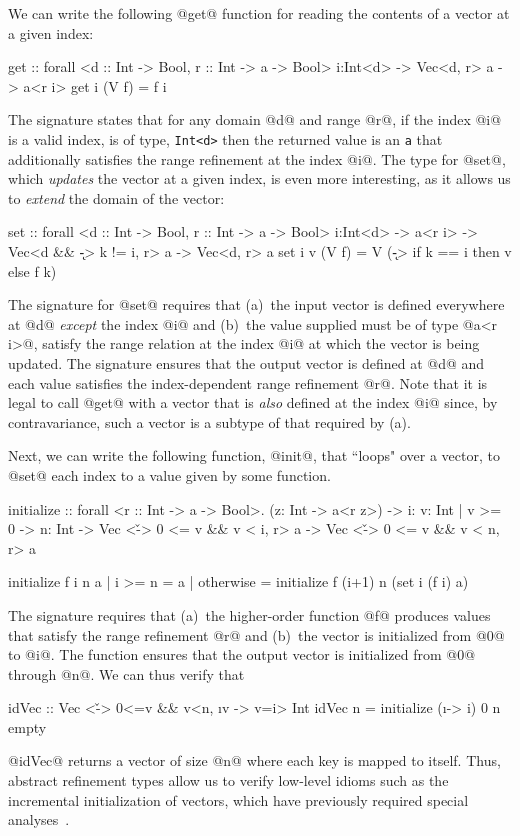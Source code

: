 {{{{
We can write the following @get@ function for reading the contents
of a vector at a given index:
%
\begin{code}
  get :: forall <d :: Int -> Bool, r :: Int -> a -> Bool>
         i:Int<d> -> Vec<d, r> a -> a<r i>
  get i (V f) = f i
\end{code}
%
The signature states that for any domain @d@ and range @r@,
if the index @i@ is a valid index, \ie is of type, \verb+Int<d>+ 
then the returned value is an \verb+a+ that additionally satisfies the
range refinement at the index @i@.
%
The type for @set@, which \emph{updates} the vector at
a given index, is even more interesting, as it allows us to 
\emph{extend} the domain of the vector:
%
\begin{code}
  set :: forall <d :: Int -> Bool, r :: Int -> a -> Bool>
         i:Int<d>
      -> a<r i>
      -> Vec<d && {\k -> k != i}, r> a
      -> Vec<d, r> a
  set i v (V f) = V (\k -> if k == i then v else f k)
\end{code}
%
The signature for @set@ requires that 
(a)~the input vector is defined everywhere at @d@ \emph{except}
the index @i@ and 
(b)~the value supplied must be of type @a<r i>@, \ie satisfy the range 
relation at the index @i@ at which the vector is being updated.
The signature ensures that the output vector is defined at
@d@ and each value satisfies the index-dependent range refinement @r@.
%
Note that it is legal to call @get@ with a vector that is \emph{also} 
defined at the index @i@ since, by contravariance, such a vector is a
subtype of that required by (a).


 Next, we can write the following function,
@init@, that ``loops" over a vector, to @set@ each index to 
a value given by some function.
%
\begin{code}
  initialize :: forall <r :: Int -> a -> Bool>.
                (z: Int -> a<r z>) 
             -> i: {v: Int | v >= 0} 
             -> n: Int 
             -> Vec <{\v -> 0 <= v && v < i}, r> a 
             -> Vec <{\v -> 0 <= v && v < n}, r> a 

  initialize f i n a 
    | i >= n    = a
    | otherwise = initialize f (i+1) n (set i (f i) a)
\end{code}
%
The signature requires that 
(a)~the higher-order function @f@ produces values that satisfy 
the range refinement @r@ and 
(b)~the vector is initialized from @0@ to @i@.
%
The function ensures that the output vector is initialized from @0@
through @n@.
%
We can thus verify that
%
\begin{code}
  idVec   :: Vec <{\v -> 0<=v && v<n}, {\i v -> v=i}> Int
  idVec n = initialize (\i -> i) 0 n empty
\end{code}
%
\ie @idVec@ returns a vector of size @n@ where each
key is mapped to itself. Thus, abstract refinement types allow us 
to verify low-level idioms such as the incremental initialization 
of vectors, which have previously required 
special analyses~\cite{Gopan05,JhalaMcMillanCAV07,CousotsPOPL11}.

}}}}
